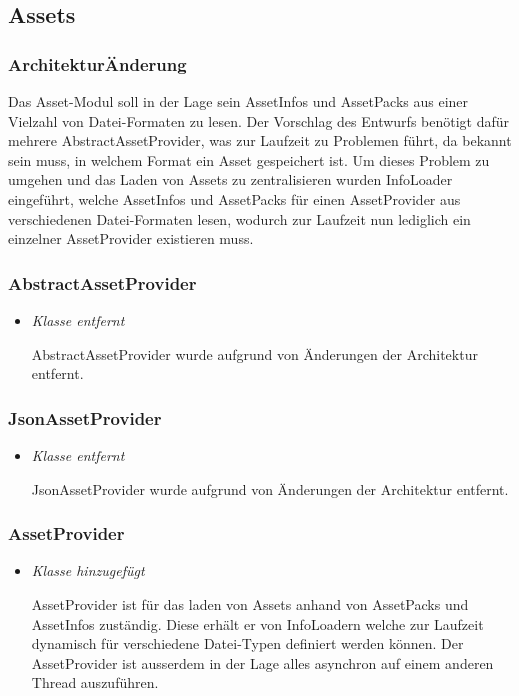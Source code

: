 \subsection{Assets}

\subsubsection{ArchitekturÄnderung}
Das Asset-Modul soll in der Lage sein AssetInfos und AssetPacks aus einer Vielzahl von Datei-Formaten
zu lesen. Der Vorschlag des Entwurfs benötigt dafür mehrere AbstractAssetProvider, was zur Laufzeit zu
Problemen führt, da bekannt sein muss, in welchem Format ein Asset gespeichert ist. Um dieses Problem zu
umgehen und das Laden von Assets zu zentralisieren wurden InfoLoader eingeführt, welche AssetInfos und
AssetPacks für einen AssetProvider aus verschiedenen Datei-Formaten lesen, wodurch zur Laufzeit nun
lediglich ein einzelner AssetProvider existieren muss.

\subsubsection{AbstractAssetProvider}
\begin{itemize}
    \item \textit{Klasse entfernt}
        \begin{leftbar}[0.9\linewidth]
            AbstractAssetProvider wurde aufgrund von Änderungen der Architektur entfernt.
        \end{leftbar}
\end{itemize}

\subsubsection{JsonAssetProvider}
\begin{itemize}
    \item \textit{Klasse entfernt}
        \begin{leftbar}[0.9\linewidth]
            JsonAssetProvider wurde aufgrund von Änderungen der Architektur entfernt.
        \end{leftbar}
\end{itemize}

\subsubsection{AssetProvider}
\begin{itemize}
    \item \textit{Klasse hinzugefügt}
        \begin{leftbar}[0.9\linewidth]
            AssetProvider ist für das laden von Assets anhand von AssetPacks und AssetInfos
            zuständig. Diese erhält er von InfoLoadern welche zur Laufzeit dynamisch für
            verschiedene Datei-Typen definiert werden können.
            Der AssetProvider ist ausserdem in der Lage alles asynchron auf einem anderen Thread
            auszuführen.
        \end{leftbar}
\end{itemize}

